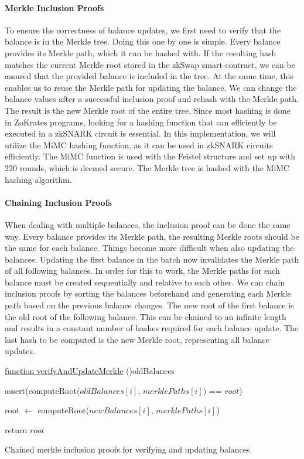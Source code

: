 \documentclass[../../thesis.tex]{subfiles}
\begin{document}
\paragraph{Merkle Inclusion Proofs}
To ensure the correctness of balance updates, we first need to verify that the balance is in the Merkle tree. Doing this one by one is simple. Every balance provides its Merkle path, which it can be hashed with. If the resulting hash matches the current Merkle root stored in the zkSwap smart-contract, we can be assured that the provided balance is included in the tree. At the same time, this enables us to reuse the Merkle path for updating the balance. We can change the balance values after a successful inclusion proof and rehash with the Merkle path. The result is the new Merkle root of the entire tree. Since most hashing is done in ZoKrates programs, looking for a hashing function that can efficiently be executed in a zkSNARK circuit is essential. In this implementation, we will utilize the MiMC \cite{albrecht2016mimc} hashing function, as it can be used in zkSNARK circuits efficiently. The MiMC function is used with the Feistel structure and set up with 220 rounds, which is deemed secure. The Merkle tree is hashed with the MiMC hashing algorithm. 

\paragraph{Chaining Inclusion Proofs} \label{chain_inclusion}
When dealing with multiple balances, the inclusion proof can be done the same way. Every balance provides its Merkle path, the resulting Merkle roots should be the same for each balance. Things become more difficult when also updating the balances. Updating the first balance in the batch now invalidates the Merkle path of all following balances. In order for this to work, the Merkle paths for each balance must be created sequentially and relative to each other. We can chain inclusion proofs by sorting the balances beforehand and generating each Merkle path based on the previous balance changes. The new root of the first balance is the old root of the following balance. This can be chained to an infinite length and results in a constant number of hashes required for each balance update. The last hash to be computed is the new Merkle root, representing all balance updates.


\begin{algorithm}

    \underline{function verifyAndUpdateMerkle}\;
    \ForEach(){oldBalances}
    {
        assert(computeRoot($oldBalances[i]$, $merklePaths[i]$) == $root$)

        root $\gets$ computeRoot($newBalances[i]$, $merklePaths[i]$)
    }

    return $root$

    \caption{Chained merkle inclusion proofs for verifying and updating balances}
\end{algorithm}
\end{document}
